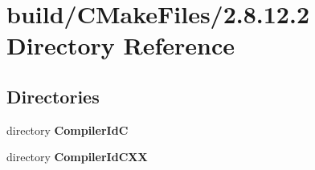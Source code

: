 \section{build/\-C\-Make\-Files/2.8.12.2 Directory Reference}
\label{dir_da9d1f60b22a094d3f39025147373af5}
\subsection*{Directories}
\begin{DoxyCompactItemize}
\item 
directory {\bf Compiler\-Id\-C}
\item 
directory {\bf Compiler\-Id\-C\-X\-X}
\end{DoxyCompactItemize}
